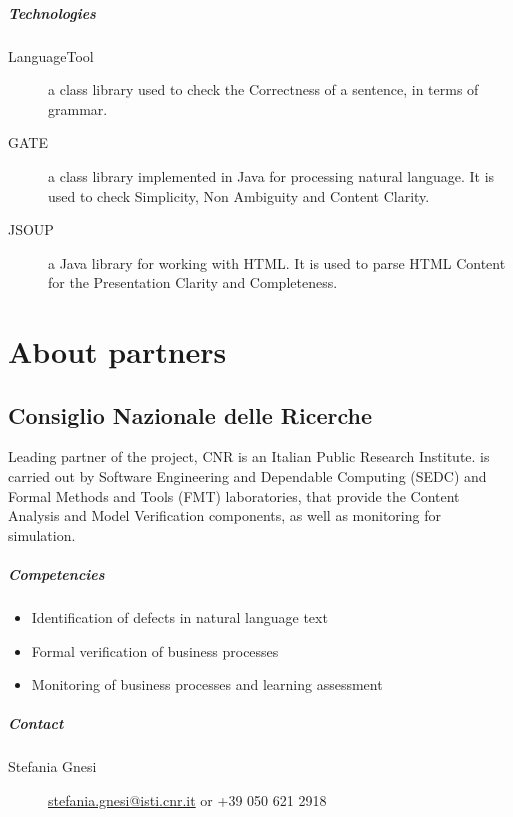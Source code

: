 \documentclass{learnpad}
\begin{document}
\paragraph{Technologies}
\begin{description}
	\item[LanguageTool] a class library used to check the Correctness of a sentence, in terms of grammar.
	\item[GATE] a class library implemented in Java for processing natural language. It is used to check Simplicity, Non Ambiguity and Content Clarity.
	\item[JSOUP] a Java library for working with HTML. It is used to parse HTML Content for the Presentation Clarity and Completeness.
\end{description}

\chapter{About partners}
\label{ch:partners}

\section{Consiglio Nazionale delle Ricerche}
Leading partner of the \learnpad project, CNR is an Italian Public Research
Institute.  \learnpad is carried out by Software Engineering and Dependable
Computing (SEDC) and Formal Methods and Tools (FMT) laboratories, that provide
the Content Analysis and Model Verification components, as well as monitoring
for simulation.

\paragraph{Competencies}
\begin{itemize}
	\item Identification of defects in natural language text
	\item Formal verification of business processes
	\item Monitoring of business processes and learning assessment
\end{itemize}

\paragraph{Contact}
\begin{description}
	\item[Stefania Gnesi] \href{mailto:stefania.gnesi@isti.cnr.it}{stefania.gnesi@isti.cnr.it} or +39 050 621 2918
\end{description}
\end{document}

